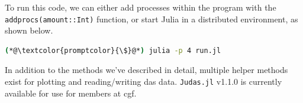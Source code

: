 To run this code, we can either add processes within the program with the \texttt{addprocs(amount::Int)} function, or start Julia in a distributed environment, as shown below.

\begin{lstlisting}[style=shellcommand, language=bash, caption=How to run a simple script containing Judas snippets]
(*@\textcolor{promptcolor}{\$}@*) julia -p 4 run.jl
\end{lstlisting}

In addition to the methods we've described in detail, multiple helper methods exist for plotting and reading/writing \acrshort{das} data. \texttt{Judas.jl} v1.1.0 is currently available for use for members at \acrshort{cgf}. 

